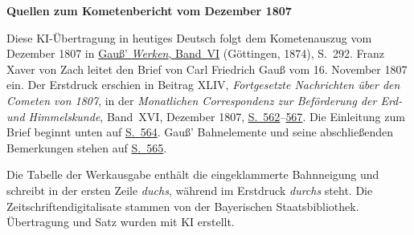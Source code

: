 \clearpage\thispagestyle{empty}
\begin{center}\textbf{Quellen zum Kometenbericht vom Dezember 1807}\end{center}
\noindent Diese KI-Übertragung in heutiges Deutsch folgt dem Kometenauszug vom Dezember 1807 in \href{https://gdz.sub.uni-goettingen.de/id/PPN236007467}{Gauß’ \textit{Werken}, Band~VI} (Göttingen, 1874), S.~292. Franz Xaver von Zach leitet den Brief von Carl Friedrich Gauß vom 16. November 1807 ein. Der Erstdruck erschien in Beitrag XLIV, \textit{Fortgesetzte Nachrichten über den Cometen von 1807}, in der \textit{Monatlichen Correspondenz zur Beförderung der Erd- und Himmelskunde}, Band~XVI, Dezember 1807, \href{https://www.digitale-sammlungen.de/en/view/bsb10538607?page=576}{S.~562}--\href{https://www.digitale-sammlungen.de/en/view/bsb10538607?page=581}{567}. Die Einleitung zum Brief beginnt unten auf \href{https://www.digitale-sammlungen.de/en/view/bsb10538607?page=578}{S.~564}. Gauß’ Bahnelemente und seine abschließenden Bemerkungen stehen auf \href{https://www.digitale-sammlungen.de/en/view/bsb10538607?page=579}{S.~565}.
\par\medskip
Die Tabelle der Werkausgabe enthält die eingeklammerte Bahnneigung und schreibt in der ersten Zeile \textit{duchs}, während im Erstdruck \textit{durchs} steht. Die Zeitschriftendigitalisate stammen von der Bayerischen Staatsbibliothek. Übertragung und Satz wurden mit KI erstellt.
\clearpage
